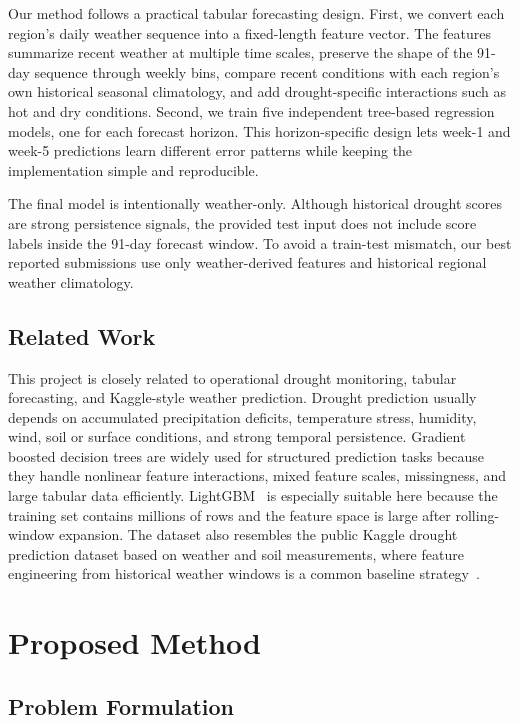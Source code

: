 \documentclass[conference]{IEEEtran}
\begin{document}
Our method follows a practical tabular forecasting design. First, we convert each
region's daily weather sequence into a fixed-length feature vector. The features
summarize recent weather at multiple time scales, preserve the shape of the
91-day sequence through weekly bins, compare recent conditions with each
region's own historical seasonal climatology, and add drought-specific
interactions such as hot and dry conditions. Second, we train five independent
tree-based regression models, one for each forecast horizon. This
horizon-specific design lets week-1 and week-5 predictions learn different
error patterns while keeping the implementation simple and reproducible.

The final model is intentionally weather-only. Although historical drought
scores are strong persistence signals, the provided test input does not include
score labels inside the 91-day forecast window. To avoid a train-test mismatch,
our best reported submissions use only weather-derived features and historical
regional weather climatology.

\subsection{Related Work}

This project is closely related to operational drought monitoring, tabular
forecasting, and Kaggle-style weather prediction. Drought prediction usually
depends on accumulated precipitation deficits, temperature stress, humidity,
wind, soil or surface conditions, and strong temporal persistence. Gradient
boosted decision trees are widely used for structured prediction tasks because
they handle nonlinear feature interactions, mixed feature scales, missingness,
and large tabular data efficiently. LightGBM~\cite{ke2017lightgbm} is especially
suitable here because the training set contains millions of rows and the feature
space is large after rolling-window expansion. The dataset also resembles the
public Kaggle drought prediction dataset based on weather and soil measurements,
where feature engineering from historical weather windows is a common baseline
strategy~\cite{kaggle_drought}.

\section{Proposed Method}

\subsection{Problem Formulation}
\end{document}
